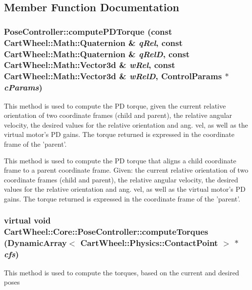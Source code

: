 \subsection{Member Function Documentation}
\hypertarget{classCartWheel_1_1Core_1_1PoseController_aac21af61ce098fa25723a64991f9f81f}{
\subsubsection[{computePDTorque}]{ PoseController::computePDTorque (const {\bf CartWheel::Math::Quaternion} \& {\em qRel}, \/  const {\bf CartWheel::Math::Quaternion} \& {\em qRelD}, \/  const {\bf CartWheel::Math::Vector3d} \& {\em wRel}, \/  const {\bf CartWheel::Math::Vector3d} \& {\em wRelD}, \/  {\bf ControlParams} $\ast$ {\em cParams})}}
\label{classCartWheel_1_1Core_1_1PoseController_aac21af61ce098fa25723a64991f9f81f}
This method is used to compute the PD torque, given the current relative orientation of two coordinate frames (child and parent), the relative angular velocity, the desired values for the relative orientation and ang. vel, as well as the virtual motor's PD gains. The torque returned is expressed in the coordinate frame of the 'parent'.

This method is used to compute the PD torque that aligns a child coordinate frame to a parent coordinate frame. Given: the current relative orientation of two coordinate frames (child and parent), the relative angular velocity, the desired values for the relative orientation and ang. vel, as well as the virtual motor's PD gains. The torque returned is expressed in the coordinate frame of the 'parent'. \hypertarget{classCartWheel_1_1Core_1_1PoseController_a48cf8c4a4ef762251f03a01ed8c24cd0}{
\subsubsection[{computeTorques}]{\setlength{\rightskip}{0pt plus 5cm}virtual void CartWheel::Core::PoseController::computeTorques (DynamicArray$<$ {\bf CartWheel::Physics::ContactPoint} $>$ $\ast$ {\em cfs})}}
\label{classCartWheel_1_1Core_1_1PoseController_a48cf8c4a4ef762251f03a01ed8c24cd0}
This method is used to compute the torques, based on the current and desired poses 

